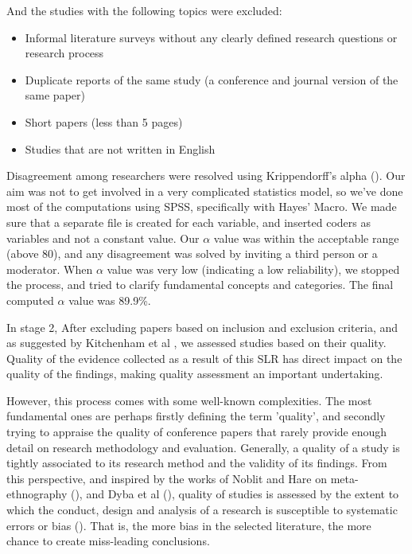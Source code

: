 \documentclass[review]{elsarticle}
\begin{document}
And the studies with the following topics were excluded: 

\begin{itemize}
    \item Informal literature surveys without any clearly defined research questions or research process
    \item Duplicate reports of the same study (a conference and journal version of the same paper)
    \item Short papers (less than 5 pages)
    \item Studies that are not written in English
\end{itemize}

Disagreement among researchers were resolved using Krippendorff’s alpha (\cite{krippendorff2011computing}). Our aim was not to get involved in a very complicated statistics model, so we've done most of the computations using SPSS, specifically with Hayes’ Macro. We made sure that a separate file is created for each variable, and inserted coders as variables and not a constant value. Our \textbf{$ \alpha $} value was within the acceptable range (above 80), and any disagreement was solved by inviting a third person or a moderator. When \textbf{$ \alpha $} value was very low (indicating a low reliability), we stopped the process, and tried to clarify fundamental concepts and categories. The final computed \textbf{$ \alpha $} value was 89.9\%. 

In stage 2, After excluding papers based on inclusion and exclusion criteria, and as suggested by Kitchenham et al \cite{kitchenham2015evidence}, we assessed studies based on their quality. Quality of the evidence collected as a result of this SLR has direct impact on the quality of the findings, making quality assessment an important undertaking.

However, this process comes with some well-known complexities. The most fundamental ones are perhaps firstly defining the term 'quality', and secondly trying to appraise the quality of conference papers that rarely provide enough detail on research methodology and evaluation. Generally, a quality of a study is tightly associated to its research method and the validity of its findings. From this perspective, and inspired by the works of Noblit and Hare on meta-ethnography (\cite{noblit1988meta}), and Dyba et al (\cite{dybaa2008empirical}), quality of studies is assessed by the extent to which the conduct, design and analysis of a research is susceptible to systematic errors or bias (\cite{cumpston2019updated}). That is, the more bias in the selected literature, the more chance to create miss-leading conclusions.
\end{document}
